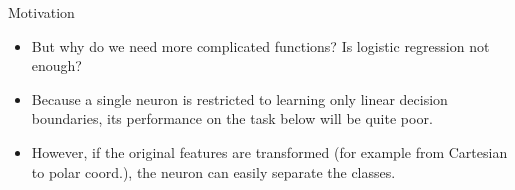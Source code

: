 \documentclass[11pt,compress,t,notes=noshow]{beamer}
\begin{document}
\begin{frame} {Motivation}
\begin{itemize}
\item \small{But why do we need more complicated functions? Is logistic regression not enough?}
\item \small{Because a single neuron is restricted to learning only linear decision boundaries, its performance on the task below will be quite poor. }
\begin{figure}
\centering
{}
\end{figure}
\item \small{However, if the original features are transformed (for example from Cartesian to polar coord.), the neuron can easily separate the classes.}
\begin{figure}
\centering
{}
\end{figure}
\end{itemize}
\end{frame}
\end{document}
